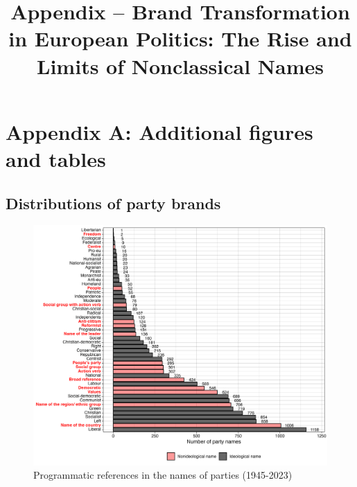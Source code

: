 \documentclass[12pt]{article}
\title{Appendix -- Brand Transformation in European Politics: The Rise and Limits of Nonclassical Names}
\date{}
\begin{document}
\sloppy

\begin{titlepage}
\begin{minipage}{\textwidth}
\maketitle
\thispagestyle{empty}
\setcounter{tocdepth}{2}
\tableofcontents
\end{minipage}
\end{titlepage}

\section{Appendix A: Additional figures and tables}

\subsection{Distributions of party brands}

\begin{figure}[H]
\includegraphics[width=\textwidth]{./Figures/ideology_types.png}
\caption{Programmatic references in the names of parties (1945-2023)}
\end{figure}

\clearpage
\end{document}
